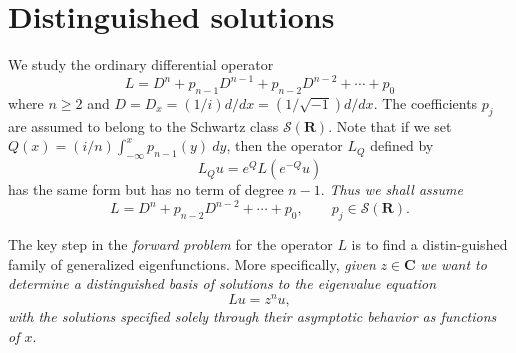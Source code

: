 \documentclass{surv-l}
\theoremstyle{plain}
\theoremstyle{definition}
\numberwithin{equation}{chapter}
\begin{document}
\section{Distinguished solutions}
\renewcommand{\theequation}{\thesection.\arabic{equation}}
We study the ordinary differential operator
\begin{equation*}
L=D^{n}+p_{n-1}D^{n-1}+p_{n-2}D^{n-2}+\cdots+p_{0}
\end{equation*}
where $n\geq 2$ and $D=D_{x}=(1/i)d/dx=(1/\sqrt{-1})d/dx$. The coefficients $p_{j}$ are assumed to belong to the Schwartz class $\mathscr{S}(\mathbf{R})$. Note that if we set $Q(x) =(i/n)\int_{-\infty}^{x}p_{n-1}(y)\ dy$, then the operator $L_{Q}$ defined by
\begin{equation*}
L_{Q}u=e^{Q}L(e^{-Q}u)
\end{equation*}
\setcounter{equation}{0}
has the same form but has no term of degree $n-1$. \emph{Thus we shall assume}
\begin{equation}\label{eq1.1}
L=D^{n}+p_{n-2}D^{n-2}+\cdots +p_{0},\qquad p_{j}\in \mathscr{S}(\mathbf{R}).
\end{equation}

The key step in the \emph{forward problem} for the operator $L$ is to find a distin-guished family of generalized eigenfunctions. More specifically, \emph{given} $z\in \mathbf{C}$ \emph{we want to determine a distinguished basis of solutions to the eigenvalue equation}
\begin{equation}\label{eq1.2}
Lu=z^{n}u,
\end{equation}
\emph{with the solutions specified solely through their asymptotic behavior as functions of $x$}.
\end{document}
